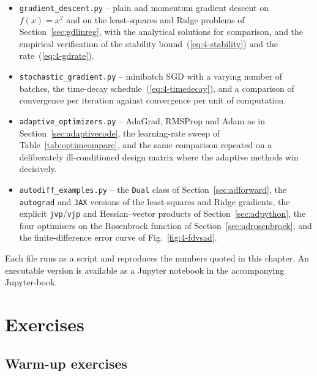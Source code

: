 \begin{itemize}
  \item \texttt{gradient\_descent.py} -- plain and momentum gradient descent on
        $f(x)=x^{2}$ and on the least-squares and Ridge problems of
        Section~\ref{sec:gdlinreg}, with the analytical solutions for
        comparison, and the empirical verification of the stability
        bound~(\ref{eq:4-stability}) and the rate~(\ref{eq:4-gdrate}).
  \item \texttt{stochastic\_gradient.py} -- minibatch SGD with a varying number
        of batches, the time-decay schedule~(\ref{eq:4-timedecay}), and a
        comparison of convergence per iteration against convergence per unit
        of computation.
  \item \texttt{adaptive\_optimizers.py} -- AdaGrad, RMSProp and Adam as in
        Section~\ref{sec:adaptivecode}, the learning-rate sweep of
        Table~\ref{tab:optimcompare}, and the same comparison repeated on a
        deliberately ill-conditioned design matrix where the adaptive methods
        win decisively.
  \item \texttt{autodiff\_examples.py} -- the \texttt{Dual} class of
        Section~\ref{sec:adforward}, the \texttt{autograd} and \texttt{JAX}
        versions of the least-squares and Ridge gradients, the explicit
        \texttt{jvp}/\texttt{vjp} and Hessian--vector products of
        Section~\ref{sec:adpython}, the four optimisers on the Rosenbrock
        function of Section~\ref{sec:adrosenbrock}, and the finite-difference
        error curve of Fig.~\ref{fig:4-fdvsad}.
\end{itemize}

Each file runs as a script and reproduces the numbers quoted in this chapter.
An executable version is available as a Jupyter notebook in the accompanying
Jupyter-book.

\section{Exercises}
\label{sec:ch4exercises}

\subsection*{Warm-up exercises}

